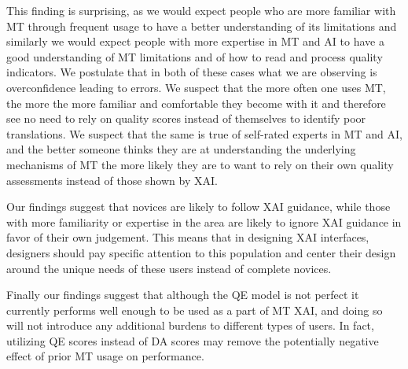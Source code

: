 This finding is surprising, as we would expect people who are more familiar with MT through frequent usage to have a better understanding of its limitations and similarly we would expect people with more expertise in MT and AI to have a good understanding of MT limitations and of how to read and process quality indicators. We postulate that in both of these cases what we are observing is overconfidence leading to errors. We suspect that the more often one uses MT, the more the more familiar and comfortable they become with it and therefore see no need to rely on quality scores instead of themselves to identify poor translations. We suspect that the same is true of self-rated experts in MT and AI, and the better someone thinks they are at understanding the underlying mechanisms of MT the more likely they are to want to rely on their own quality assessments instead of those shown by XAI.

Our findings suggest that novices are likely to follow XAI guidance, while those with more familiarity or expertise in the area are likely to ignore XAI guidance in favor of their own judgement. This means that in designing XAI interfaces, designers should pay specific attention to this population and center their design around the unique needs of these users instead of complete novices. 

Finally our findings suggest that although the QE model is not perfect it currently performs well enough to be used as a part of MT XAI, and doing so will not introduce any additional burdens to different types of users. In fact, utilizing QE scores instead of DA scores may remove the potentially negative effect of prior MT usage on performance.  


